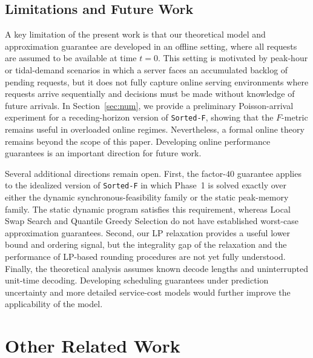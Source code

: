\documentclass[nonblindrev]{informs3_hide}
\newcommand{\sortF}{\texttt{Sorted-F}}
\begin{document}
\subsection{Limitations and Future Work}

A key limitation of the present work is that our theoretical model and approximation guarantee are developed in an offline setting, where all requests are assumed to be available at time $t=0$. This setting is motivated by peak-hour or tidal-demand scenarios in which a server faces an accumulated backlog of pending requests, but it does not fully capture online serving environments where requests arrive sequentially and decisions must be made without knowledge of future arrivals. In Section~\ref{sec:num}, we provide a preliminary Poisson-arrival experiment for a receding-horizon version of \sortF{}, showing that the $F$-metric remains useful in overloaded online regimes. Nevertheless, a formal online theory remains beyond the scope of this paper. Developing online performance guarantees is an important direction for future work.

Several additional directions remain open. First, the factor-$40$ guarantee applies to the idealized version of \sortF{} in which Phase~1 is solved exactly over either the dynamic synchronous-feasibility family or the static peak-memory family. The static dynamic program satisfies this requirement, whereas Local Swap Search and Quantile Greedy Selection do not have established worst-case approximation guarantees. Second, our LP relaxation provides a useful lower bound and ordering signal, but the integrality gap of the relaxation and the performance of LP-based rounding procedures are not yet fully understood. Finally, the theoretical analysis assumes known decode lengths and uninterrupted unit-time decoding. Developing scheduling guarantees under prediction uncertainty and more detailed service-cost models would further improve the applicability of the model.


 



\ECSwitch


\section{Other Related Work} \label{sec:other}
\end{document}
